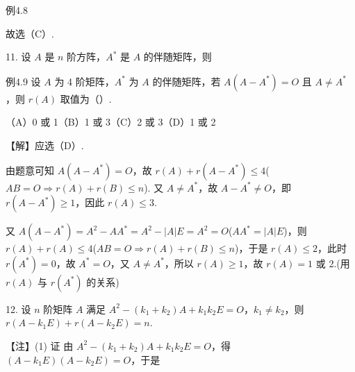 \begin{fcard}{例4.8}

故选（C）.
\end{fcard}

11. 设 $A$ 是 $n$ 阶方阵，$A^{*}$ 是 $A$ 的伴随矩阵，则


\begin{fcard}{例4.9}
设 $A$ 为 4 阶矩阵，$A^{*}$ 为 $A$ 的伴随矩阵，若 $A(A-A^{*})=O$ 且 $A\ne A^{*}$，则 $r(A)$ 取值为（\quad）.

（A）0 或 1\qquad（B）1 或 3\qquad（C）2 或 3\qquad（D）1 或 2

【解】应选（D）.

由题意可知 $A(A-A^{*})=O$，故 $r(A)+r(A-A^{*})\le4$\quad($AB=O\Rightarrow r(A)+r(B)\le n$). 又 $A\ne A^{*}$，故 $A-A^{*}\ne O$，即 $r(A-A^{*})\ge1$，因此 $r(A)\le3$.

又 $A(A-A^{*})=A^2-AA^{*}=A^2-|A|E=A^2=O$\quad($AA^{*}=|A|E$)，则 $r(A)+r(A)\le4$\quad($AB=O\Rightarrow r(A)+r(B)\le n$)，于是 $r(A)\le2$，此时 $r(A^{*})=0$，故 $A^{*}=O$，又 $A\ne A^{*}$，所以 $r(A)\ge1$，故 $r(A)=1$ 或 2.\quad(用 $r(A)$ 与 $r(A^{*})$ 的关系)
\end{fcard}

12. 设 $n$ 阶矩阵 $A$ 满足 $A^2-(k_1+k_2)A+k_1k_2E=O$，$k_1\ne k_2$，则 $r(A-k_1E)+r(A-k_2E)=n$.

\begin{fnote}
【注】(1) 证 由 $A^2-(k_1+k_2)A+k_1k_2E=O$，得 $(A-k_1E)(A-k_2E)=O$，于是
\end{fnote}

